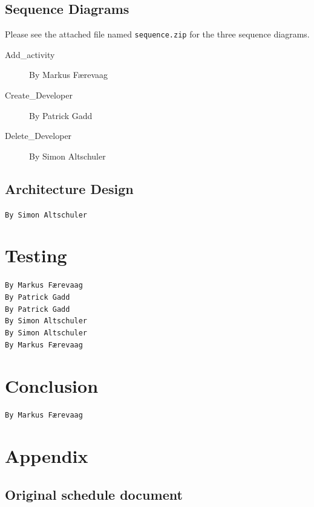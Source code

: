 \documentclass[danish]{article}
\newcommand{\code}[1]{\texttt{#1}}
\begin{document}
\subsection{Sequence Diagrams}
Please see the attached file named \code{sequence.zip} for the three sequence diagrams. 
\begin{description}
\item[Add\_activity] By Markus Færevaag
\item[Create\_Developer] By Patrick Gadd
\item[Delete\_Developer] By Simon Altschuler
\end{description}

\subsection{Architecture Design}
\texttt{By Simon Altschuler}\\


\section{Testing}

\texttt{By Markus Færevaag}\\

\texttt{By Patrick Gadd}\\

\texttt{By Patrick Gadd}\\

\texttt{By Simon Altschuler}\\

\texttt{By Simon Altschuler}\\

\texttt{By Markus Færevaag}\\


\section{Conclusion}
\texttt{By Markus Færevaag}\\


\section{Appendix}
\subsection{Original schedule document}

\end{document}
